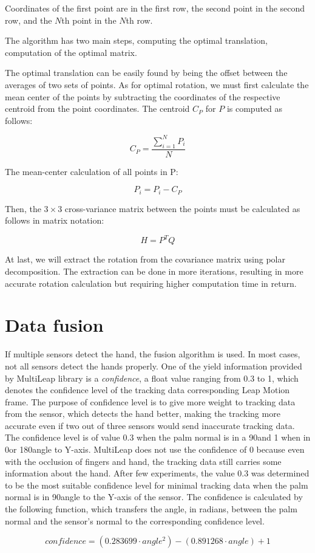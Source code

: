 Coordinates of the first point are in the first row, the second point in the second row, and the $N$th point in the $N$th row.

The algorithm has two main steps, computing the optimal translation, computation of the optimal matrix.

The optimal translation can be easily found by being the offset between the averages of two sets of points. As for optimal rotation, we must first calculate the mean center of the points by subtracting the coordinates of the respective centroid from the point coordinates. The centroid $C_P$ for $P$ is computed as follows:

\begin{equation}
    {C_P = {\frac{\sum_{i=1}^{N}P_i}{N}}}
\end{equation}

The mean-center calculation of all points in P:

\begin{equation}
    {P_i = P_i - C_P}
\end{equation}

Then, the $3\times3$ cross-variance matrix between the points must be calculated as follows in matrix notation:

\begin{equation}
    {H = P^T Q}
\end{equation}

At last, we will extract the rotation from the covariance matrix using polar decomposition. The extraction can be done in more iterations, resulting in more accurate rotation calculation but requiring higher computation time in return.

\section{Data fusion}

If multiple sensors detect the hand, the fusion algorithm is used. In most cases, not all sensors detect the hands properly. One of the yield information provided by MultiLeap library is a \textit{confidence}, a float value ranging from 0.3 to 1, which denotes the confidence level of the tracking data corresponding Leap Motion frame. The purpose of confidence level is to give more weight to tracking data from the sensor, which detects the hand better, making the tracking more accurate even if two out of three sensors would send inaccurate tracking data. The confidence level is of value 0.3 when the palm normal is in a 90\textdegree and 1 when in 0\textdegree or 180\textdegree angle to Y-axis. MultiLeap does not use the confidence of 0 because even with the occlusion of fingers and hand, the tracking data still carries some information about the hand. After few experiments, the value 0.3 was determined to be the most suitable confidence level for minimal tracking data when the palm normal is in 90\textdegree angle to the Y-axis of the sensor. The confidence is calculated by the following function, which transfers the angle, in radians, between the palm normal and the sensor's normal to the corresponding confidence level. \cite{tomasMultileap}

\begin{equation}
    {confidence = (0.283699 \cdot angle^2)-(0.891268 \cdot angle)+1}
\end{equation}

